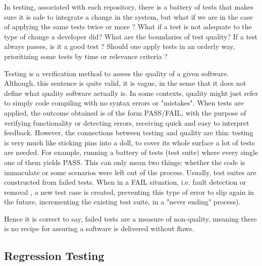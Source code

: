 In testing, associated with each repository, there is a battery of tests that makes sure it is safe to integrate a change in the system, but what if we are in the case of applying the same tests twice or more ? What if a test is not adequate to the type of change a developer did? What are the boundaries of test quality? If a test always passes, is it a good test ? Should one apply tests in an orderly way, prioritizing some tests by time or relevance criteria ? 
\par Testing is a verification method to assess the quality of a given software. Although, this sentence is quite valid, it is vague, in the sense that it does not define what quality software actually is. 
In some contexts, quality might just refer to simply code compiling with no syntax errors or "mistakes". When tests are applied, the outcome obtained is of the form PASS/FAIL, with the purpose of verifying functionality or detecting errors, receiving quick and easy to interpret feedback. However, the connections between testing and quality are thin: testing is very much like sticking pins into a doll, to cover its whole surface a lot of tests are needed. For example, running a battery of tests (test suite) where every single one of them yields PASS. This can only mean two things: whether the code is immaculate or some scenarios were left out of the process. Usually, test suites are constructed from failed tests. When in a FAIL situation, i.e. fault detection or removal , a new test case is created, preventing this type of error to slip again in the future, incrementing the existing test suite, in a "never ending" process). 
\par Hence it is correct to say, failed tests are a measure of non-quality, meaning there is no recipe for assuring a software is delivered without flaws.  \cite{7PrinciplesSoftTest}


\subsection{Regression Testing}


